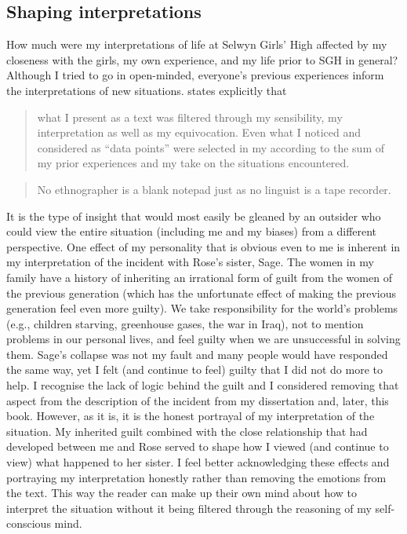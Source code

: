 \subsection{Shaping interpretations}

How much were my interpretations of life at Selwyn Girls' High affected by my closeness with the girls, my own  experience, and my life prior to SGH in general?  Although I tried to go in open-minded, everyone's previous experiences inform the interpretations of new situations. \citet{mendozadenton2008} states explicitly that

\begin{quote}
	what I present as a text was filtered through my sensibility, my interpretation as well as my equivocation. Even what I noticed and considered as ``data points'' were selected in my  according to the sum of my prior experiences and my take on the situations encountered. \citep[44]{mendozadenton2008}
\end{quote}

\begin{quote}
	No ethnographer is a blank note\-pad just as no linguist is a tape re\-corder. \citep[48]{mendozadenton2008}
\end{quote}
 
\noindent It is the type of insight that would most easily be gleaned by an outsider who could view the entire situation (including me and my biases) from a different perspective. One effect of my personality that is obvious even to me is inherent in my interpretation of the incident with Rose's sister, Sage. The women in my family have a history of inheriting an irrational form of guilt from the women of the previous generation (which has the unfortunate effect of making the previous generation feel even more guilty). We take responsibility for the world's problems (e.g., children starving, greenhouse gases, the war in Iraq), not to mention problems in our personal lives, and feel guilty when we are unsuccessful in solving them. Sage's collapse was not my fault and many people would have responded the same way, yet I felt (and continue to feel) guilty that I did not do more to help. I recognise the lack of logic behind the guilt and I considered removing that aspect from the description of the incident from my dissertation and, later, this book. However, as it is, it is the honest portrayal of my interpretation of the situation. My inherited guilt combined with the close relationship that had developed between me and Rose served to shape how I viewed (and continue to view) what happened to her sister. I feel better acknowledging these effects and portraying my interpretation honestly rather than removing the emotions from the text. This way the reader can make up their own mind about how to interpret the situation without it being filtered through the reasoning of my self-conscious mind.

